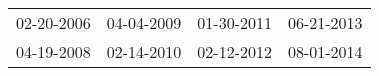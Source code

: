 \begin{supertabular}{llll}
 02-20-2006 &  04-04-2009 &  01-30-2011 &  06-21-2013 \\
 04-19-2008 &  02-14-2010 &  02-12-2012 &  08-01-2014 \\
\end{supertabular}
